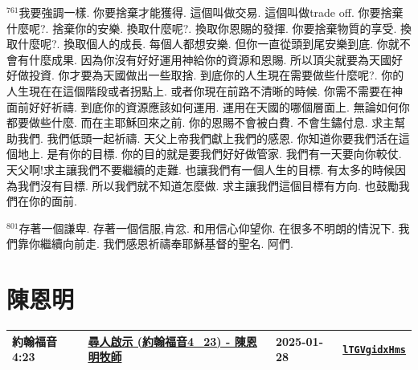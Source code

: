 \documentclass{book}
\begin{document}
$^{761}$我要強調一樣.
你要捨棄才能獲得.
這個叫做交易.
這個叫做trade off.
你要捨棄什麼呢?.
捨棄你的安樂.
換取什麼呢?.
換取你恩賜的發揮.
你要捨棄物質的享受.
換取什麼呢?.
換取個人的成長.
每個人都想安樂.
但你一直從頭到尾安樂到底.
你就不會有什麼成果.
因為你沒有好好運用神給你的資源和恩賜.
所以頂尖就要為天國好好做投資.
你才要為天國做出一些取捨.
到底你的人生現在需要做些什麼呢?.
你的人生現在在這個階段或者拐點上.
或者你現在前路不清晰的時候.
你需不需要在神面前好好祈禱.
到底你的資源應該如何運用.
運用在天國的哪個層面上.
無論如何你都要做些什麼.
而在主耶穌回來之前.
你的恩賜不會被白費.
不會生鏽付息.
求主幫助我們.
我們低頭一起祈禱.
天父上帝我們獻上我們的感恩.
你知道你要我們活在這個地上.
是有你的目標.
你的目的就是要我們好好做管家.
我們有一天要向你較仗.
天父啊!求主讓我們不要繼續的走難.
也讓我們有一個人生的目標.
有太多的時候因為我們沒有目標.
所以我們就不知道怎麼做.
求主讓我們這個目標有方向.
也鼓勵我們在你的面前.

$^{801}$存著一個謙卑.
存著一個信服,肯忿.
和用信心仰望你.
在很多不明朗的情況下.
我們靠你繼續向前走.
我們感恩祈禱奉耶穌基督的聖名.
阿們.
\newpage



\chapter{陳恩明}\label{ch:preacher15}
\begin{multicols}{3}
\minitoc
\end{multicols}
{ \scriptsize


\begin{xltabular}{\textwidth}{|p{0.15\textwidth} p{0.6\textwidth}|p{0.07\textwidth} p{0.1\textwidth}|}
\hline
約翰福音 4:23 & \hyperref[sec:lTGVgidxHms]{尋人啟示 (約翰福音4\_23) - 陳恩明牧師} & 2025-01-28 & \href{https://youtube.com/watch?v=lTGVgidxHms}{\texttt{lTGVgidxHms}} \\
\hline
\end{xltabular}
}
\newpage
\end{document}
